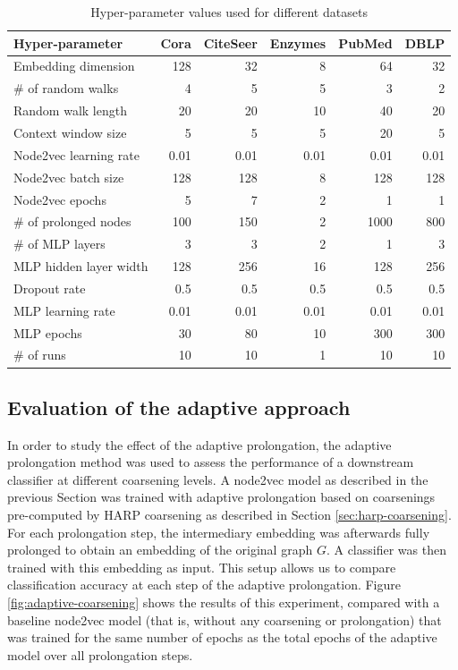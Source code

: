 \begin{table}
  \caption{Hyper-parameter values used for different datasets}
  \label{tab:hyperparameter-values}
  \begin{tabular}{lrrrrr}
    \toprule
    Hyper-parameter        & Cora & CiteSeer & Enzymes & PubMed & DBLP \\
    \midrule
    Embedding dimension    & 128  & 32       & 8       & 64     & 32   \\
    \# of random walks     & 4    & 5        & 5       & 3      & 2    \\
    Random walk length     & 20   & 20       & 10      & 40     & 20   \\
    Context window size    & 5    & 5        & 5       & 20     & 5    \\
    Node2vec learning rate & 0.01 & 0.01     & 0.01    & 0.01   & 0.01 \\
    Node2vec batch size    & 128  & 128      & 8       & 128    & 128  \\
    Node2vec epochs        & 5    & 7        & 2       & 1      & 1    \\
    \# of prolonged nodes  & 100  & 150      & 2       & 1000   & 800  \\
    \# of MLP layers       & 3    & 3        & 2       & 1      & 3    \\
    MLP hidden layer width & 128  & 256      & 16      & 128    & 256  \\
    Dropout rate           & 0.5  & 0.5      & 0.5     & 0.5    & 0.5  \\
    MLP learning rate      & 0.01 & 0.01     & 0.01    & 0.01   & 0.01 \\
    MLP epochs             & 30   & 80       & 10      & 300    & 300  \\
    \# of runs             & 10   & 10       & 1       & 10     & 10   \\
    \bottomrule
  \end{tabular}
\end{table}

\subsection{Evaluation of the adaptive approach}

In order to study the effect of the adaptive prolongation, the adaptive prolongation method was used to assess the performance of a downstream classifier at different coarsening levels. A node2vec model as described in the previous Section was trained with adaptive prolongation based on coarsenings pre-computed by HARP coarsening as described in Section \ref{sec:harp-coarsening}. For each prolongation step, the intermediary embedding was afterwards fully prolonged to obtain an embedding of the original graph \( G \). A classifier was then trained with this embedding as input. This setup allows us to compare classification accuracy at each step of the adaptive prolongation. Figure \ref{fig:adaptive-coarsening} shows the results of this experiment, compared with a baseline node2vec model (that is, without any coarsening or prolongation) that was trained for the same number of epochs as the total epochs of the adaptive model over all prolongation steps.


